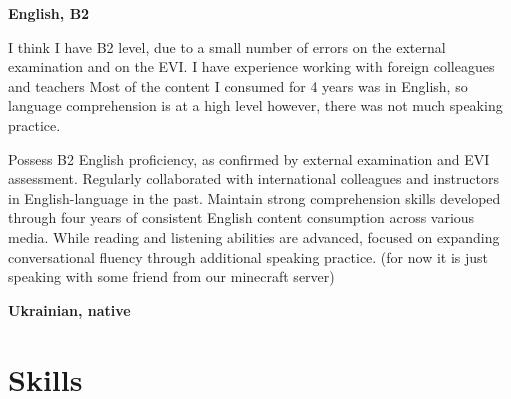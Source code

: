 \documentclass[10pt, letterpaper]{article}
\begin{document}
        \begin{samepage}
            \textbf{English, B2}


            I think I have B2 level, due to a small number of errors on the external examination and on the EVI. 
            I have experience working with foreign colleagues and teachers Most of the content I consumed for 4 years was in English, so language comprehension is at a high level however, there was not much speaking practice.

            Possess B2 English proficiency, as confirmed by external examination and EVI assessment. Regularly collaborated with international colleagues and instructors in English-language in the past. Maintain strong comprehension skills developed through four years of consistent English content consumption across various media. While reading and listening abilities are advanced, focused on expanding conversational fluency through additional speaking practice. (for now it is just speaking with some friend from our minecraft server)

            \textbf{Ukrainian, native}

        \end{samepage}

    \section{Skills}
\end{document}
